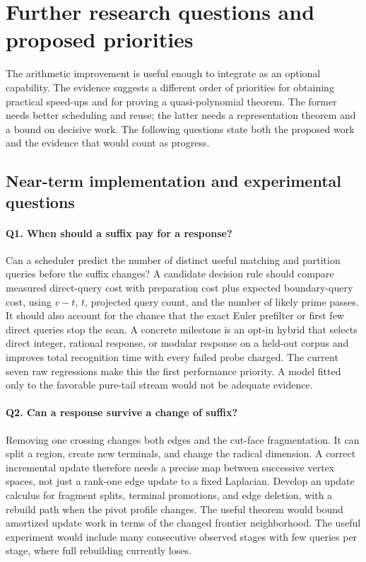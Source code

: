 \section{Further research questions and proposed priorities}
\label{sec:research}

The arithmetic improvement is useful enough to integrate as an optional
capability. The evidence suggests a different order of priorities for obtaining
practical speed-ups and for proving a quasi-polynomial theorem. The former
needs better scheduling and reuse; the latter needs a representation theorem
and a bound on decisive work. The following questions state both the proposed
work and the evidence that would count as progress.

\subsection{Near-term implementation and experimental questions}

\paragraph{Q1. When should a suffix pay for a response?}
Can a scheduler predict the number of distinct useful matching and partition
queries before the suffix changes? A candidate decision rule should compare
measured direct-query cost with preparation cost plus expected boundary-query
cost, using $v-t$, $t$, projected query count, and the number of likely prime
passes. It should also account for the chance that the exact Euler prefilter
or first few direct queries stop the scan. A concrete milestone is an opt-in
hybrid that selects direct integer, rational response, or modular response
on a held-out corpus and improves total recognition time with every failed
probe charged. The current seven raw regressions make this the first
performance priority. A model fitted only to the favorable pure-tail stream
would not be adequate evidence.

\paragraph{Q2. Can a response survive a change of suffix?}
Removing one crossing changes both edges and the cut-face fragmentation. It can
split a region, create new terminals, and change the radical dimension. A
correct incremental update therefore needs a precise map between successive
vertex spaces, not just a rank-one edge update to a fixed Laplacian. Develop
an update calculus for fragment splits, terminal promotions, and edge deletion,
with a rebuild path when the pivot profile changes. The useful theorem would
bound amortized update work in terms of the changed frontier neighborhood.
The useful experiment would include many consecutive observed stages with
few queries per stage, where full rebuilding currently loses.

